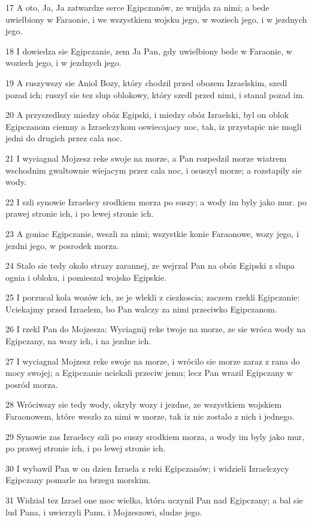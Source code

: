 \par 17 A oto, Ja, Ja zatwardze serce Egipczanów, ze wnijda za nimi; a bede uwielbiony w Faraonie, i we wszystkiem wojsku jego, w woziech jego, i w jezdnych jego.
\par 18 I dowiedza sie Egipczanie, zem Ja Pan, gdy uwielbiony bede w Faraonie, w woziech jego, i w jezdnych jego.
\par 19 A ruszywszy sie Aniol Bozy, który chodzil przed obozem Izraelskim, szedl pozad ich; ruszyl sie tez slup oblokowy, który szedl przed nimi, i stanal pozad im.
\par 20 A przyszedlszy miedzy obóz Egipski, i miedzy obóz Izraelski, byl on oblok Egipczanom ciemny a Izraelczykom oswiecajacy noc, tak, iz przystapic nie mogli jedni do drugich przez cala noc.
\par 21 I wyciagnal Mojzesz reke swoje na morze, a Pan rozpedzil morze wiatrem wschodnim gwaltownie wiejacym przez cala noc, i osuszyl morze; a rozstapily sie wody.
\par 22 I szli synowie Izraelscy srodkiem morza po suszy; a wody im byly jako mur. po prawej stronie ich, i po lewej stronie ich.
\par 23 A goniac Egipczanie, weszli za nimi; wszystkie konie Faraonowe, wozy jego, i jezdni jego, w posrodek morza.
\par 24 Stalo sie tedy okolo strazy zarannej, ze wejrzal Pan na obóz Egipski z slupa ognia i obloku, i pomieszal wojsko Egipskie.
\par 25 I porzucal kola wozów ich, ze je wlekli z ciezkoscia; zaczem rzekli Egipczanie: Uciekajmy przed Izraelem, bo Pan walczy za nimi przeciwko Egipczanom.
\par 26 I rzekl Pan do Mojzesza: Wyciagnij reke twoje na morze, ze sie wróca wody na Egipczany, na wozy ich, i na jezdne ich.
\par 27 I wyciagnal Mojzesz reke swoje na morze, i wrócilo sie morze zaraz z rana do mocy swojej; a Egipczanie uciekali przeciw jemu; lecz Pan wrazil Egipczany w posród morza.
\par 28 Wróciwszy sie tedy wody, okryly wozy i jezdne, ze wszystkiem wojskiem Faraonowem, które weszlo za nimi w morze, tak iz nie zostalo z nich i jednego.
\par 29 Synowie zas Izraelscy szli po suszy srodkiem morza, a wody im byly jako mur, po prawej stronie ich, i po lewej stronie ich.
\par 30 I wybawil Pan w on dzien Izraela z reki Egipczanów; i widzieli Izraelczycy Egipczany pomarle na brzegu morskim.
\par 31 Widzial tez Izrael one moc wielka, która uczynil Pan nad Egipczany; a bal sie lud Pana, i uwierzyli Panu, i Mojzeszowi, sludze jego.

